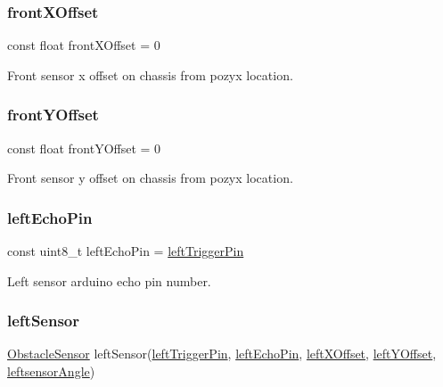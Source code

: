 \mbox{\label{bot_main_8ino_abdd898a2dfa2f64e2821af36c6ed3724}} 
\subsubsection{\texorpdfstring{front\+X\+Offset}{frontXOffset}}
{\footnotesize\ttfamily const float front\+X\+Offset = 0}



Front sensor x offset on chassis from pozyx location. 

\mbox{\label{bot_main_8ino_a4919465d0182f44aa7acaa39ece1e17a}} 
\subsubsection{\texorpdfstring{front\+Y\+Offset}{frontYOffset}}
{\footnotesize\ttfamily const float front\+Y\+Offset = 0}



Front sensor y offset on chassis from pozyx location. 

\mbox{\label{bot_main_8ino_a203479aa2174a6eedd63da361e6e302c}} 
\subsubsection{\texorpdfstring{left\+Echo\+Pin}{leftEchoPin}}
{\footnotesize\ttfamily const uint8\+\_\+t left\+Echo\+Pin = \mbox{\hyperlink{bot_main_8ino_a297d5238270dc0d92e1a65b016a79f2e}{left\+Trigger\+Pin}}}



Left sensor arduino echo pin number. 

\mbox{\label{bot_main_8ino_af137d1119f05ab98ae8e50559b9d6bfe}} 
\subsubsection{\texorpdfstring{left\+Sensor}{leftSensor}}
{\footnotesize\ttfamily \mbox{\hyperlink{class_obstacle_sensor}{Obstacle\+Sensor}} left\+Sensor(\mbox{\hyperlink{bot_main_8ino_a297d5238270dc0d92e1a65b016a79f2e}{left\+Trigger\+Pin}}, \mbox{\hyperlink{bot_main_8ino_a203479aa2174a6eedd63da361e6e302c}{left\+Echo\+Pin}}, \mbox{\hyperlink{bot_main_8ino_a2d121af61e2977de12f5bfbbe8559dca}{left\+X\+Offset}}, \mbox{\hyperlink{bot_main_8ino_a7be9826e4f54e376321bcdea4177a8ed}{left\+Y\+Offset}}, \mbox{\hyperlink{bot_main_8ino_a8be5324bad65fa0bad41e0c70066a958}{leftsensor\+Angle}})}



